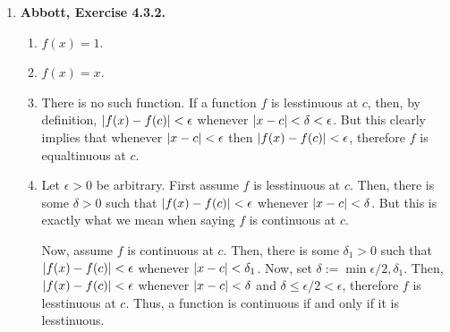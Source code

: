 \documentclass{article}
\DeclarePairedDelimiter\abs{\lvert}{\rvert}
\newcommand{\R}{\mathbb{R}}
\newcommand{\exc}[2][Abbott]{\item \textbf{#1, Exercise #2.}}
\newcommand{\lep}[1][L]{#1et $\epsilon > 0$ be arbitrary}
\begin{document}
\begin{enumerate}
\begin{enumerate}
        \item Assume $c > 0$. Choose $\delta = \min \left( 1, \epsilon ((c-1)^{2/3} + \sqrt[3]{c^2-c} + c^{2/3})\right)$. It is not hard to check that $x^{2/3} + \sqrt[3]{x c} + c^{2/3} > (c-1)^{2/3} + \sqrt[3]{c^2-c} + c^{2/3}$ whenever $\abs{x-c} < 1 \leq \delta$. Then, 
        \begin{align*}
           \abs{\sqrt[3]{x}-\sqrt[3]{c}} &= \abs*{\sqrt[3]{x}-\sqrt[3]{c}} \abs*{\frac{x^{2/3} + \sqrt[3]{x c} + c^{2/3}}{x^{2/3} + \sqrt[3]{x c} + c^{2/3}}} \\
            &= \frac{\abs{x-c}}{x^{2/3} + \sqrt[3]{x c} + c^{2/3}} \\
            &< \frac{\abs{x-c}}{(c-1)^{2/3} + \sqrt[3]{c^2-c} + c^{2/3}} < \epsilon
        \end{align*} whenever $\abs{x-c} < \delta$. Now, assume $c < 0$. Choose $\delta$ such that $\abs{\sqrt[3]{x}-\sqrt[3]{-c}} < \epsilon$ whenever $\abs{x-c} < \delta$. Using the fact that $\sqrt[3]{-y} = -\sqrt[3]{y}$ for any $y \in \R$, we can conclude that $\abs{\sqrt[3]{x}-\sqrt[3]{-c}} = \abs{(-\sqrt[3]{x}) - \sqrt[3]{c}} < \epsilon$. This means that the function $(-1) g(x)$ is continuous at $c$, but Theorem 4.3.4 allows us to conclude that $(-1) (-1) g(x) = g(x)$ must also be continuous at $c$.
    \end{enumerate}
    
    \exc{4.3.2}
    \begin{enumerate}
        \item $f(x) = 1$.
        
        \item $f(x) = x$.
        
        \item There is no such function. If a function $f$ is lesstinuous at $c$, then, by definition, $\abs{f(x)-f(c)} < \epsilon$ whenever $\abs{x-c} < \delta < \epsilon$. But this clearly implies that whenever $\abs{x-c} < \epsilon$ then $\abs{f(x)-f(c)} < \epsilon$, therefore $f$ is equaltinuous at $c$.
        
        \item \lep. First assume $f$ is lesstinuous at $c$. Then, there is some $\delta > 0$ such that $\abs{f(x)-f(c)} < \epsilon$ whenever $\abs{x-c} < \delta$. But this is exactly what we mean when saying $f$ is continuous at $c$.
        
        Now, assume $f$ is continuous at $c$. Then, there is some $\delta_1 > 0$ such that $\abs{f(x)-f(c)} < \epsilon$ whenever $\abs{x-c} < \delta_1$. Now, set $\delta := \min{\epsilon/2, \delta_1}$. Then, $\abs{f(x)-f(c)} < \epsilon$ whenever $\abs{x-c} < \delta$ and $\delta \leq \epsilon/2 < \epsilon$, therefore $f$ is lesstinuous at $c$.
        Thus, a function is continuous if and only if it is lesstinuous.
        

\end{enumerate}
\end{enumerate}
\end{document}
